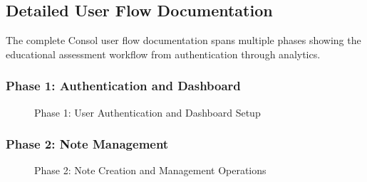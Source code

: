 
\clearpage
\subsection{Detailed User Flow Documentation}

The complete Consol user flow documentation spans multiple phases showing the educational assessment workflow from authentication through analytics.

\subsubsection{Phase 1: Authentication and Dashboard}

\begin{figure}[H]
\centering
{}
\caption{Phase 1: User Authentication and Dashboard Setup}
\label{fig:phase1_auth_corrected}
\end{figure}

\clearpage
\subsubsection{Phase 2: Note Management}

\begin{figure}[H]
\centering
{}
\caption{Phase 2: Note Creation and Management Operations}
\label{fig:phase2_notes_corrected}
\end{figure}

